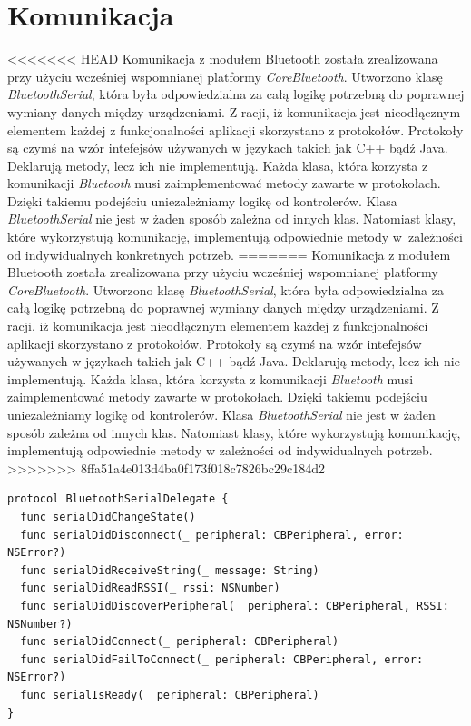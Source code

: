 \section{Komunikacja}
<<<<<<< HEAD
Komunikacja z modułem Bluetooth została zrealizowana przy użyciu wcześniej wspomnianej platformy \textit{CoreBluetooth}. Utworzono klasę \textit{BluetoothSerial}, która była odpowiedzialna za całą logikę potrzebną do poprawnej wymiany danych między urządzeniami. Z racji, iż komunikacja jest nieodłącznym elementem każdej z funkcjonalności aplikacji skorzystano z protokołów. Protokoły są czymś na wzór intefejsów używanych w językach takich jak C++ bądź Java. Deklarują metody, lecz ich nie implementują. Każda klasa, która korzysta z komunikacji \textit{Bluetooth} musi zaimplementować metody zawarte w protokołach. Dzięki takiemu podejściu uniezależniamy logikę od kontrolerów. Klasa \textit{BluetoothSerial} nie jest w żaden sposób zależna od innych klas. Natomiast klasy, które wykorzystują komunikację, implementują odpowiednie metody w~zależności od indywidualnych konkretnych potrzeb.
=======
Komunikacja z modułem Bluetooth została zrealizowana przy użyciu wcześniej wspomnianej platformy \textit{CoreBluetooth}. Utworzono klasę \textit{BluetoothSerial}, która była odpowiedzialna za całą logikę potrzebną do poprawnej wymiany danych między urządzeniami. Z racji, iż komunikacja jest nieodłącznym elementem każdej z funkcjonalności aplikacji skorzystano z protokołów. Protokoły są czymś na wzór intefejsów używanych w językach takich jak C++ bądź Java. Deklarują metody, lecz ich nie implementują. Każda klasa, która korzysta z komunikacji \textit{Bluetooth} musi zaimplementować metody zawarte w protokołach. Dzięki takiemu podejściu uniezależniamy logikę od kontrolerów. Klasa \textit{BluetoothSerial} nie jest w żaden sposób zależna od innych klas. Natomiast klasy, które wykorzystują komunikację, implementują odpowiednie metody w zależności od indywidualnych potrzeb.
>>>>>>> 8ffa51a4e013d4ba0f173f018c7826bc29c184d2

\begin{minipage}{\textwidth}
	\begin{lstlisting}[label=protocolcode,caption=Protokół odpowiedzialny za komunikację między urządzeniami.]
protocol BluetoothSerialDelegate {
  func serialDidChangeState()
  func serialDidDisconnect(_ peripheral: CBPeripheral, error: NSError?)
  func serialDidReceiveString(_ message: String)
  func serialDidReadRSSI(_ rssi: NSNumber)
  func serialDidDiscoverPeripheral(_ peripheral: CBPeripheral, RSSI: NSNumber?)
  func serialDidConnect(_ peripheral: CBPeripheral)
  func serialDidFailToConnect(_ peripheral: CBPeripheral, error: NSError?)
  func serialIsReady(_ peripheral: CBPeripheral)
}
	\end{lstlisting}
\end{minipage}

